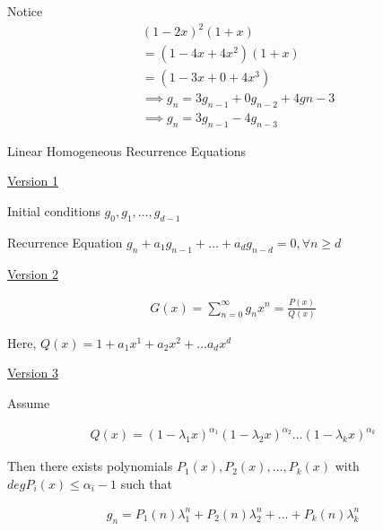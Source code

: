 \documentclass{article}
\begin{document}
Notice
\begin{align*}
    &(1-2x)^2(1+x) \\
    &= (1-4x+4x^2)(1+x) \\
    &= (1-3x + 0 + 4x^3) \\
    &\implies g_n = 3g_{n-1} + 0 g_{n-2} + 4g{n-3} \\
    &\implies g_n = 3g_{n-1} - 4g_{n-3}
\end{align*}

Linear Homogeneous Recurrence Equations

\underline{Version 1}

Initial conditions $g_0, g_1, \ldots, g_{d-1}$

Recurrence Equation $g_n + a_1g_{n-1}+\ldots+a_dg_{n-d}=0, \forall n \ge d$

\underline{Version 2}

\begin{align*}
    G(x) = \sum_{n=0}^{\infty}g_nx^n = \frac{P(x)}{Q(x)}
\end{align*}

Here, $Q(x) = 1 + a_1x^1 + a_2x^2 + \ldots a_dx^d$


\underline{Version 3}

Assume 

\begin{align*}
    Q(x) = (1-\lambda_1x)^{\alpha_1}(1-\lambda_2x)^{\alpha_2}\ldots(1-\lambda_kx)^{\alpha_k}
\end{align*}

Then there exists polynomials $P_1(x), P_2(x), \ldots, P_k(x)$ with $deg P_i(x) \le \alpha_i - 1$ such that 

\begin{align*}
    g_n = P_1(n)\lambda_1^n + P_2(n)\lambda_2^n + \ldots + P_k(n)\lambda_k^n
\end{align*}
\end{document}
